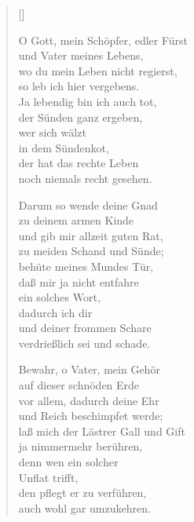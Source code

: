 \begin{multicols}{2}
\settowidth{\versewidth}{der nichts mehr schmeckt, nichts sieht und hört,}
\begin{verse}[\versewidth]

 O Gott, mein Schöpfer, edler Fürst\\
und Vater meines Lebens,\\
wo du mein Leben nicht regierst,\\
so leb ich hier vergebens.\\
Ja lebendig bin ich auch tot,\\
der Sünden ganz ergeben,\\
wer sich wälzt\\
in dem Sündenkot,\\
der hat das rechte Leben\\
noch niemals recht gesehen.

 Darum so wende deine Gnad\\
zu deinem armen Kinde\\
und gib mir allzeit guten Rat,\\
zu meiden Schand und Sünde;\\
behüte meines Mundes Tür,\\
daß mir ja nicht entfahre\\
ein solches Wort,\\
dadurch ich dir\\
und deiner frommen Schare\\
verdrießlich sei und schade.

 Bewahr, o Vater, mein Gehör\\
auf dieser schnöden Erde\\
vor allem, dadurch deine Ehr\\
und Reich beschimpfet werde;\\
laß mich der Lästrer Gall und Gift\\
ja nimmermehr berühren,\\
denn wen ein solcher\\
Unflat trifft,\\
den pflegt er zu verführen,\\
auch wohl gar umzukehren.


\end{verse}
\end{multicols}
